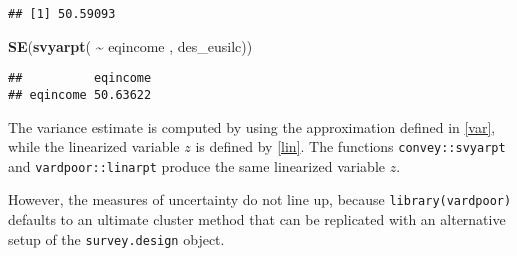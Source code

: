 \documentclass[
]{book}
\newenvironment{Shaded}{\begin{snugshade}}{\end{snugshade}}
\newcommand{\FunctionTok}[1]{\textcolor[rgb]{0.13,0.29,0.53}{\textbf{#1}}}
\newcommand{\NormalTok}[1]{#1}
\newcommand{\SpecialCharTok}[1]{\textcolor[rgb]{0.81,0.36,0.00}{\textbf{#1}}}
\begin{document}
\begin{verbatim}
## [1] 50.59093
\end{verbatim}

\begin{Shaded}
\begin{Highlighting}[]
\FunctionTok{SE}\NormalTok{(}\FunctionTok{svyarpt}\NormalTok{( }\SpecialCharTok{\textasciitilde{}}\NormalTok{ eqincome , des\_eusilc))}
\end{Highlighting}
\end{Shaded}

\begin{verbatim}
##          eqincome
## eqincome 50.63622
\end{verbatim}

The variance estimate is computed by using the approximation defined in \ref{var}, while the linearized variable \(z\) is defined by \ref{lin}. The functions \texttt{convey::svyarpt} and \texttt{vardpoor::linarpt} produce the same linearized variable \(z\).

However, the measures of uncertainty do not line up, because \texttt{library(vardpoor)} defaults to an ultimate cluster method that can be replicated with an alternative setup of the \texttt{survey.design} object.
\end{document}
